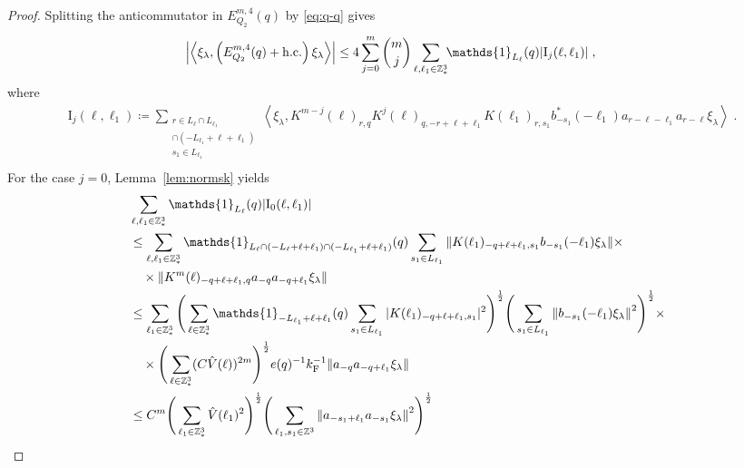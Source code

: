\documentclass[12pt,a4paper]{article}
\numberwithin{equation}{section}
\newcommand{\1}{\mathbb{I}}
\newcommand{\F}{\mathrm{F}}
\newcommand{\I}{\mathrm{I}}
\newcommand{\Z}{\mathbb{Z}}
\newcommand{\half}{\frac{1}{2}}
\newcommand{\eva}[1]{\left\langle #1 \right\rangle}
\theoremstyle{plain}
\theoremstyle{definition}
\theoremstyle{remark}
\theoremstyle{plain}
\theoremstyle{definition}
\theoremstyle{remark}
\begin{document}
\begin{proof}
Splitting the anticommutator in $ E^{m,4}_{Q_2}(q) $ by \eqref{eq:q-q} gives
\begin{equation} \label{eq:EQ2171}
\begin{aligned}
	& \abs{\eva{\xi_\lambda,\left(E^{m,4}_{Q_2}(q) + \mathrm{h.c.}\right) \xi_\lambda }}
	\le 4 \sum_{j=0}^m {{m}\choose j} \sum_{\ell,\ell_1 \in \Z^3_*}\!\! \mathds{1}_{L_\ell}(q) |\I_j(\ell, \ell_1)| \;,
	\end{aligned}
\end{equation}
where
\begin{equation}
\begin{aligned}
	& \I_j(\ell, \ell_1)
	\coloneq \sum_{\substack{r\in L_{\ell} \cap L_{\ell_1}\\ \cap (-L_{\ell_1}+\ell+\ell_1)\\ s_1 \in L_{\ell_1}}}
		\eva{\xi_\lambda, K^{m-j}(\ell)_{r,q} K^{j}(\ell)_{q,-r+\ell+\ell_1} K(\ell_1)_{r,s_1} b^*_{-s_1}(-\ell_1) a_{r-\ell-\ell_1} a_{r-\ell} \xi_\lambda} \;. \\
\end{aligned}
\end{equation}
For the case $ j = 0 $, Lemma~\ref{lem:normsk} yields
\begin{align}
	&\sum_{\ell,\ell_1 \in \Z^3_*} \mathds{1}_{L_\ell}(q) |\I_0(\ell, \ell_1)| \nonumber\\
	&\leq \sum_{\ell,\ell_1 \in \Z^3_*} \mathds{1}_{L_\ell \cap (-L_\ell + \ell + \ell_1) \cap (-L_{\ell_1} + \ell + \ell_1)}(q) \sum\limits_{s_1 \in L_{\ell_1}}
		\norm{K(\ell_1)_{-q+\ell+\ell_1,s_1} b_{-s_1}(-\ell_1)  \xi_\lambda} \times \nonumber\\
	&\quad \times \norm{ K^m(\ell)_{-q+\ell+\ell_1,q}a_{-q}a_{-q+\ell_1}  \xi_\lambda } \nonumber\\
	&\leq \sum_{\ell_1 \in \Z^3_*}
		\Bigg( \sum_{\ell \in \Z^3_*} \mathds{1}_{-L_{\ell_1} + \ell + \ell_1}(q) \sum\limits_{s_1 \in L_{\ell_1}} |K(\ell_1)_{-q+\ell+\ell_1,s_1}|^2 \Bigg)^{\half}
		\Bigg( \sum\limits_{s_1 \in L_{\ell_1}} \norm{ b_{-s_1}(-\ell_1)  \xi_\lambda}^2 \Bigg)^{\half} \times \nonumber\\
	&\quad \times \Bigg( \sum_{\ell \in \Z^3_*} (C \hat{V}(\ell))^{2m} \Bigg)^{\half}
		e(q)^{-1} k_{\F}^{-1}
		\norm{a_{-q}a_{-q+\ell_1}  \xi_\lambda } \nonumber\\
	&\leq C^m \Bigg( \sum_{\ell_1 \in \Z^3_*}
		\hat{V}(\ell_1)^2 \Bigg)^{\half}
		\Bigg( \sum_{\ell_1,s_1 \in \Z^3} \norm{a_{-s_1+\ell_1} a_{-s_1} \xi_\lambda}^2 \Bigg)^{\frac 12}

\end{align}
\end{proof}
\end{document}
